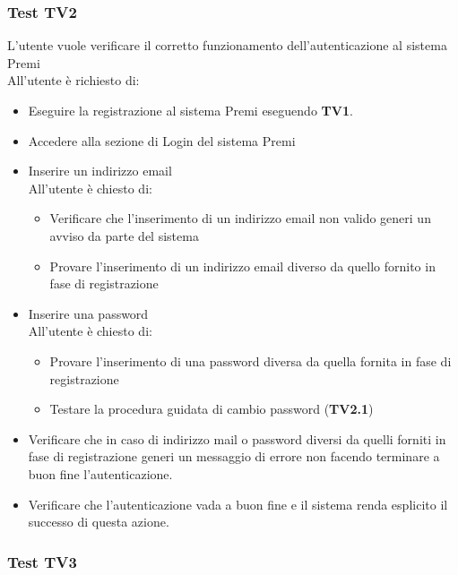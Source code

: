 \subsubsection {Test TV2} %
L'utente vuole verificare il corretto funzionamento dell'autenticazione al sistema Premi\\
All'utente è richiesto di:
\begin{itemize}
	\item Eseguire la registrazione al sistema Premi eseguendo \textbf{TV1}.
	\item Accedere alla sezione di Login del sistema Premi
	\item Inserire un indirizzo email \\
		All'utente è chiesto di: 
		\begin{itemize}
			\item Verificare che l'inserimento di un indirizzo email non valido generi un avviso da parte del sistema
			\item Provare l'inserimento di un indirizzo email diverso da quello fornito in fase di registrazione
		\end{itemize}
	\item Inserire una password\\
	All'utente è chiesto di: 
			\begin{itemize}
				\item Provare l'inserimento di una password diversa da quella fornita in fase di registrazione
				\item Testare la procedura guidata di cambio password (\textbf{TV2.1})
			\end{itemize}
	\item Verificare che in caso di indirizzo mail o password diversi da quelli forniti in fase di registrazione generi un messaggio di errore non facendo terminare a buon fine l'autenticazione.
	\item Verificare che l'autenticazione vada a buon fine e il sistema renda esplicito il successo di questa azione.
\end{itemize}
	 
\subsubsection {Test TV3} %

